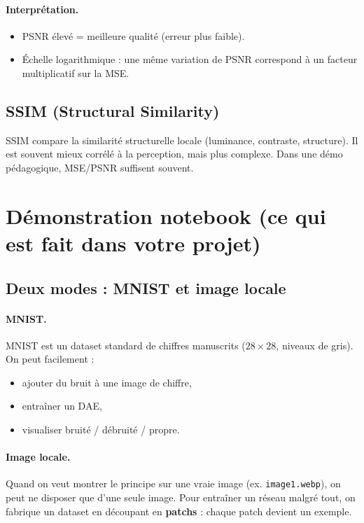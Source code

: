 \documentclass[11pt,a4paper]{article}
\begin{document}
\paragraph{Interprétation.}
\begin{itemize}
  \item PSNR élevé = meilleure qualité (erreur plus faible).
  \item Échelle logarithmique : une même variation de PSNR correspond à un facteur multiplicatif sur la MSE.
\end{itemize}

\subsection{SSIM (Structural Similarity)}

SSIM compare la similarité structurelle locale (luminance, contraste, structure).
Il est souvent mieux corrélé à la perception, mais plus complexe.
Dans une démo pédagogique, MSE/PSNR suffisent souvent.

\section{Démonstration notebook (ce qui est fait dans votre projet)}

\subsection{Deux modes : MNIST et image locale}

\paragraph{MNIST.}
MNIST est un dataset standard de chiffres manuscrits ($28\times 28$, niveaux de gris). On peut facilement :
\begin{itemize}
  \item ajouter du bruit à une image de chiffre,
  \item entraîner un DAE,
  \item visualiser bruité / débruité / propre.
\end{itemize}

\paragraph{Image locale.}
Quand on veut montrer le principe sur une vraie image (ex. \texttt{image1.webp}), on peut ne disposer que d'une seule image.
Pour entraîner un réseau malgré tout, on fabrique un dataset en découpant en \textbf{patchs} : chaque patch devient un exemple.
\end{document}
